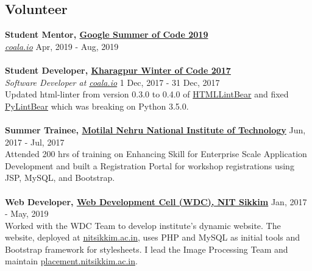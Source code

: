 \documentclass[margin, centered]{res}
\begin{document}
\begin{resume}
    \section{Volunteer}
    \textbf{Student Mentor, \href{https://summerofcode.withgoogle.com/}{Google Summer of Code 2019}} \\
    \emph{\href{https://coala.io/}{coala.io}} \hfill Apr, 2019 - Aug, 2019 \\
    \\
    \textbf{Student Developer, \href{https://kwoc.kossiitkgp.in}{Kharagpur Winter of Code 2017}} \\
    \emph{Software Developer at \href{https://coala.io/}{coala.io}} \hfill 1 Dec, 2017 - 31 Dec, 2017 \\
    Updated html-linter from version 0.3.0 to 0.4.0 of
    \href{https://github.com/coala/coala-bears/pull/2148/commits/631ed37f7322fae7b9d7e16616f8c4009b9adb7e}{HTMLLintBear}
    and fixed \href{https://github.com/coala/coala-bears/blob/master/bears/python/PyLintBear.py}{PyLintBear} which was
    breaking on Python 3.5.0. \\
    \\
    \textbf{Summer Trainee, \href{http://www.mnnit.ac.in/}{Motilal Nehru National Institute of Technology}} \hfill Jun, 2017 - Jul, 2017 \\
    Attended 200 hrs of training on Enhancing Skill for Enterprise Scale Application Development and built a Registration
    Portal for workshop registrations using JSP, MySQL, and Bootstrap. \\
    \\
    \textbf{Web Developer, \href{https://nitsikkim.ac.in/webdevelopmentcell}{Web Development Cell (WDC), NIT Sikkim}} \hfill Jan, 2017 - May, 2019 \\
    Worked with the WDC Team to develop institute's dynamic website. The website, deployed at
    \href{https://www.nitsikkim.ac.in}{nitsikkim.ac.in}, uses PHP and MySQL as initial tools
    and Bootstrap framework for stylesheets. I lead the Image Processing Team and maintain
    \href{https://placement.nitsikkim.ac.in}{placement.nitsikkim.ac.in}. \\


\end{resume}
\end{document}

